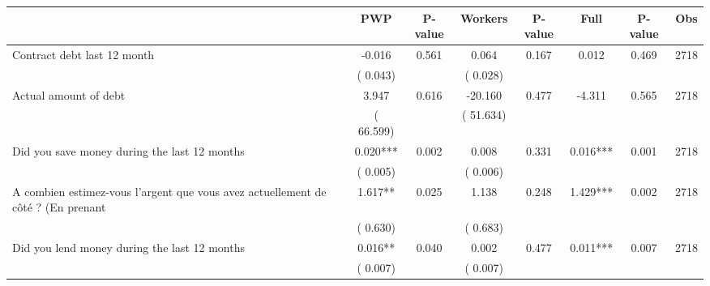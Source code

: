 
\begin{tabular}{l*{7}{c}}\hline&\multicolumn{1}{c}{PWP}&\multicolumn{1}{c}{P-value}&\multicolumn{1}{c}{Workers}&\multicolumn{1}{c}{P-value}&\multicolumn{1}{c}{Full}&\multicolumn{1}{c}{P-value}&\multicolumn{1}{c}{Obs} \\ \hline

 Contract debt last 12 month       &             -0.016       &        0.561  &              0.064       &        0.167  &              0.012       &              0.469 &  2718 \\ 
                       &       (       0.043)             &                               &       (       0.028)                     &                               &                                               &                                &                      \\ 

 Actual amount of debt       &              3.947       &        0.616  &            -20.160       &        0.477  &             -4.311       &              0.565 &  2718 \\ 
                       &       (      66.599)             &                               &       (      51.634)                     &                               &                                               &                                &                      \\ 

 Did you save money during the last 12 months       &              0.020***       &        0.002  &              0.008       &        0.331  &              0.016***       &              0.001 &  2718 \\ 
                       &       (       0.005)             &                               &       (       0.006)                     &                               &                                               &                                &                      \\ 

 A combien estimez-vous l'argent que vous avez actuellement de côté ? (En prenant       &              1.617**       &        0.025  &              1.138       &        0.248  &              1.429***       &              0.002 &  2718 \\ 
                       &       (       0.630)             &                               &       (       0.683)                     &                               &                                               &                                &                      \\ 

 Did you lend money during the last 12 months       &              0.016**       &        0.040  &              0.002       &        0.477  &              0.011***       &              0.007 &  2718 \\ 
                       &       (       0.007)             &                               &       (       0.007)                     &                               &                                               &                                &                      \\ 

\hline \end{tabular}